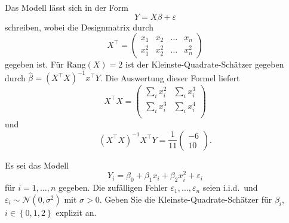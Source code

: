 \solution Das Modell lässt sich in der Form
\begin{equation*}
    Y = X \beta + \varepsilon
\end{equation*}
schreiben, wobei die Designmatrix durch 
\begin{equation*}
    X^\top = \left(
    \begin{array}{cccc}
        x_1     & x_2   & \ldots & x_n \\
        x_1^2   & x_2^2 & \ldots & x_n^2
    \end{array}
    \right)
\end{equation*} 
gegeben ist. Für $\textrm{Rang}(X) = 2$ ist der Kleinste-Quadrate-Schätzer
gegeben durch $\hat \beta = \left( X^{\top} X \right)^{-1} x^{\top} Y$. Die
Auswertung dieser Formel liefert
\begin{equation*}
    X^\top X = \left(
    \begin{array}{ccc}
        \sum_{i}^{} x_i^2 & \sum_{i}^{} x_i^3 \\
        \sum_{i}^{} x_i^3 & \sum_{i}^{} x_i^4 \\
    \end{array}
    \right)
\end{equation*}
und 
\begin{equation*}
    \left( X^{\top} X \right)^{-1} X^{\top} Y = \frac{1}{11} \left( 
    \begin{matrix}
        -6 \\ 10
    \end{matrix}
    \right).
\end{equation*}




  Es sei das Modell
\begin{equation*}
    Y_i = \beta_0 + \beta_1 x_i + \beta_2 x_{i}^2 + \varepsilon_i
\end{equation*}
für $i=1,\ldots,n$ gegeben. Die zufälligen Fehler $\varepsilon_1,\ldots,\varepsilon_n$ 
seien i.i.d.\ und $\varepsilon_i\sim \mathcal N(0,\sigma^2)$ mit $\sigma>0$.
Geben Sie die Kleinste-Quadrate-Schätzer für $\beta_i$, $i\in \left\{ 0,1,2 \right\}$ explizit an.


